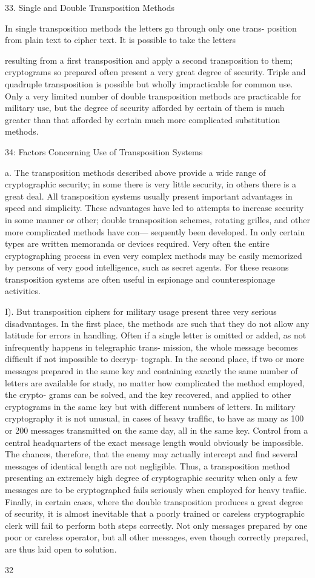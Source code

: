 33. Single and Double Transposition Methods

In single transposition methods the letters go through only one trans-
position from plain text to cipher text. It is possible to take the letters


resulting from a ﬁrst transposition and apply a second transposition to
them; cryptograms so prepared often present a very great degree of
security. Triple and quadruple transposition is possible but wholly
impracticable for common use. Only a very limited number of double
transposition methods are practicable for military use, but the degree of
security afforded by certain of them is much greater than that afforded
by certain much more complicated substitution methods.

34: Factors Concerning Use of Transposition Systems

a. The transposition methods described above provide a wide range
of cryptographic security; in some there is very little security, in others
there is a great deal. All transposition systems usually present important
advantages in speed and simplicity. These advantages have led to attempts
to increase security in some manner or other; double transposition
schemes, rotating grilles, and other more complicated methods have con—
sequently been developed. In only certain types are written memoranda
or devices required. Very often the entire cryptographing process in even
very complex methods may be easily memorized by persons of very good
intelligence, such as secret agents. For these reasons transposition systems
are often useful in espionage and counterespionage activities.

I). But transposition ciphers for military usage present three very
serious disadvantages. In the ﬁrst place, the methods are such that they
do not allow any latitude for errors in handling. Often if a single letter
is omitted or added, as not infrequently happens in telegraphic trans-
mission, the whole message becomes difﬁcult if not impossible to decryp-
tograph. In the second place, if two or more messages prepared in the
same key and containing exactly the same number of letters are available
for study, no matter how complicated the method employed, the crypto-
grams can be solved, and the key recovered, and applied to other
cryptograms in the same key but with different numbers of letters. In
military cryptography it is not unusual, in cases of heavy traﬂﬁc, to have
as many as 100 or 200 messages transmitted on the same day, all in the
same key. Control from a central headquarters of the exact message
length would obviously be impossible. The chances, therefore, that the
enemy may actually intercept and ﬁnd several messages of identical
length are not negligible. Thus, a transposition method presenting an
extremely high degree of cryptographic security when only a few
messages are to be cryptographed fails seriously when employed for
heavy traﬁic. Finally, in certain cases, where the double transposition
produces a great degree of security, it is almost inevitable that a poorly
trained or careless cryptographic clerk will fail to perform both steps
correctly. Not only messages prepared by one poor or careless operator,
but all other messages, even though correctly prepared, are thus laid
open to solution.

32

